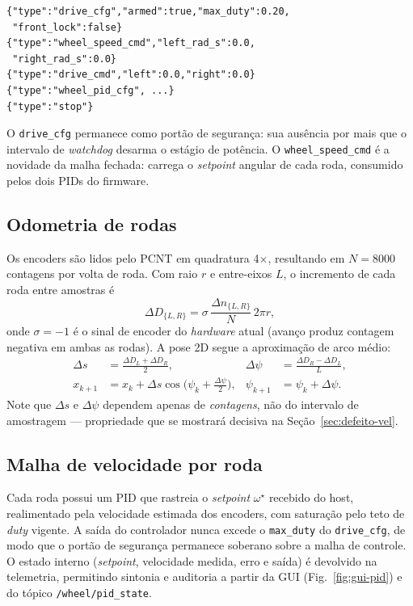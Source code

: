 \documentclass[conference]{IEEEtran}
\begin{document}
\begin{lstlisting}[basicstyle=\ttfamily\scriptsize]
{"type":"drive_cfg","armed":true,"max_duty":0.20,
 "front_lock":false}
{"type":"wheel_speed_cmd","left_rad_s":0.0,
 "right_rad_s":0.0}
{"type":"drive_cmd","left":0.0,"right":0.0}
{"type":"wheel_pid_cfg", ...}
{"type":"stop"}
\end{lstlisting}

O \texttt{drive\_cfg} permanece como portão de segurança: sua ausência por mais
que o intervalo de \emph{watchdog} desarma o estágio de potência. O
\texttt{wheel\_speed\_cmd} é a novidade da malha fechada: carrega o
\emph{setpoint} angular de cada roda, consumido pelos dois PIDs do firmware.

\subsection{Odometria de rodas}

Os encoders são lidos pelo PCNT em quadratura 4$\times$, resultando em
$N=\num{8000}$ contagens por volta de roda. Com raio $r$ e entre-eixos $L$, o
incremento de cada roda entre amostras é
\begin{equation}
\Delta D_{\{L,R\}} = \sigma \, \frac{\Delta n_{\{L,R\}}}{N} \, 2\pi r,
\end{equation}
\noindent onde $\sigma=-1$ é o sinal de encoder do \emph{hardware} atual (avanço
produz contagem negativa em ambas as rodas). A pose 2D segue a aproximação de
arco médio:
\begin{align}
\Delta s &= \frac{\Delta D_L + \Delta D_R}{2}, &
\Delta \psi &= \frac{\Delta D_R - \Delta D_L}{L},\\
x_{k+1} &= x_k + \Delta s\cos\!\Big(\psi_k+\tfrac{\Delta\psi}{2}\Big), &
\psi_{k+1} &= \psi_k + \Delta\psi .
\end{align}
Note que $\Delta s$ e $\Delta \psi$ dependem apenas de \emph{contagens}, não do
intervalo de amostragem --- propriedade que se mostrará decisiva na
Seção~\ref{sec:defeito-vel}.

\subsection{Malha de velocidade por roda}

Cada roda possui um PID que rastreia o \emph{setpoint} $\omega^\star$ recebido do
host, realimentado pela velocidade estimada dos encoders, com saturação pelo teto
de \emph{duty} vigente. A saída do controlador nunca excede o
\texttt{max\_duty} do \texttt{drive\_cfg}, de modo que o portão de segurança
permanece soberano sobre a malha de controle. O estado interno (\emph{setpoint},
velocidade medida, erro e saída) é devolvido na telemetria, permitindo sintonia e
auditoria a partir da GUI (Fig.~\ref{fig:gui-pid}) e do tópico
\texttt{/wheel/pid\_state}.
\end{document}
